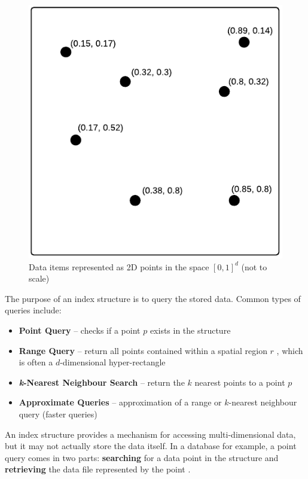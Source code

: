 \begin{figure}
	\vspace{-22pt}
	\begin{center}
		\includegraphics[scale=0.6]{figures/2D_data_space.pdf}
	\end{center}
	\vspace{-15pt}
	\caption{Data items represented as 2D points in the space $[0, 1]^d$ (not to scale)}
	\label{fig:data-space}
\end{figure}

The purpose of an index structure is to query the stored data. Common types of queries include:
\begin{itemize}
	\item \textbf{Point Query} -- checks if a point $p$ exists in the structure \cite{rplus-tree}
	\item \textbf{Range Query} -- return all points contained within a spatial region $r$ \cite{rplus-tree}, which is often a $d$-dimensional hyper-rectangle \cite{r-tree, pk-tree, pyramid-tree}
	\item \textbf{\textit{k}-Nearest Neighbour Search} -- return the $k$ nearest points to a point $p$ \cite{pk-tree}
	\item \textbf{Approximate Queries} -- approximation of a range or $k$-nearest neighbour query (faster queries) \cite{splay-quadtree} 
\end{itemize}

An index structure provides a mechanism for accessing multi-dimensional data, but it may not actually store the data itself. In a database for example, a point query comes in two parts: \textbf{searching} for a data point in the structure and \textbf{retrieving} the data file represented by the point \cite{rsr-tree}.

